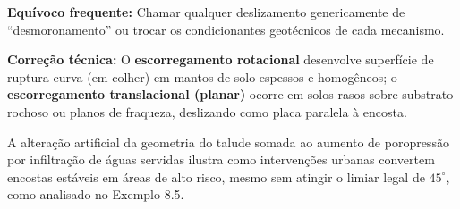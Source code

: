 \begin{boxErro}
\textbf{Equívoco frequente:} Chamar qualquer deslizamento genericamente de ``desmoronamento'' ou trocar os condicionantes geotécnicos de cada mecanismo.\par
\textbf{Correção técnica:} O \textbf{escorregamento rotacional} desenvolve superfície de ruptura curva (em colher) em mantos de solo espessos e homogêneos; o \textbf{escorregamento translacional (planar)} ocorre em solos rasos sobre substrato rochoso ou planos de fraqueza, deslizando como placa paralela à encosta.
\end{boxErro}


A alteração artificial da geometria do talude somada ao aumento de poropressão por infiltração de águas servidas ilustra como intervenções urbanas convertem encostas estáveis em áreas de alto risco, mesmo sem atingir o limiar legal de $45^\circ$, como analisado no Exemplo 8.5.


